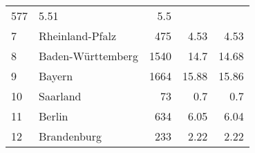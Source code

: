 \begin{longtable}{lXrrr}
       \num{577} &
       \num[round-mode=places,round-precision=2]{5,51} &
         \num[round-mode=places,round-precision=2]{5,5} \\

     7 &
     \multicolumn{1}{X}{ Rheinland-Pfalz   } &


       \num{475} &
       \num[round-mode=places,round-precision=2]{4,53} &
         \num[round-mode=places,round-precision=2]{4,53} \\

     8 &
     \multicolumn{1}{X}{ Baden-Württemberg   } &


       \num{1540} &
       \num[round-mode=places,round-precision=2]{14,7} &
         \num[round-mode=places,round-precision=2]{14,68} \\

     9 &
     \multicolumn{1}{X}{ Bayern   } &


       \num{1664} &
       \num[round-mode=places,round-precision=2]{15,88} &
         \num[round-mode=places,round-precision=2]{15,86} \\

     10 &
     \multicolumn{1}{X}{ Saarland   } &


       \num{73} &
       \num[round-mode=places,round-precision=2]{0,7} &
         \num[round-mode=places,round-precision=2]{0,7} \\

     11 &
     \multicolumn{1}{X}{ Berlin   } &


       \num{634} &
       \num[round-mode=places,round-precision=2]{6,05} &
         \num[round-mode=places,round-precision=2]{6,04} \\

     12 &
     \multicolumn{1}{X}{ Brandenburg   } &


       \num{233} &
       \num[round-mode=places,round-precision=2]{2,22} &
         \num[round-mode=places,round-precision=2]{2,22} \\


\end{longtable}
